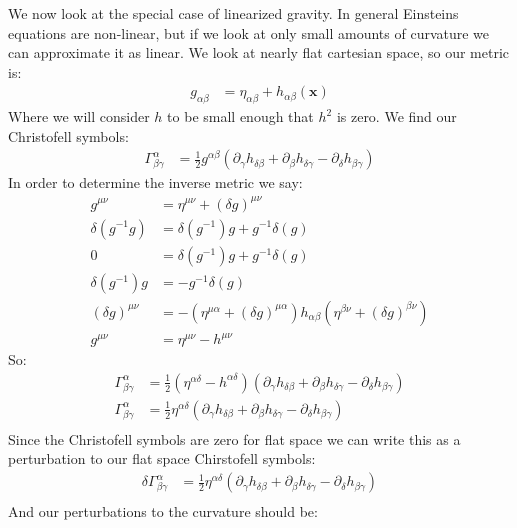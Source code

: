 We now look at the special case of linearized gravity. In general Einsteins equations are non-linear, but if we look at only small amounts of curvature we can approximate it as linear.
We look at nearly flat cartesian space, so our metric is:
\begin{align*}
	g_{\alpha\beta} &= \eta_{\alpha\beta} + h_{\alpha\beta}(\bm{x})
\end{align*}
Where we will consider $h$ to be small enough that $h^2$ is zero.
We find our Christofell symbols:
\begin{align*}
	\Gamma^\alpha_{\beta\gamma} &= \frac{1}{2} g^{\alpha\beta}(\partial_\gamma h_{\delta\beta} + \partial_\beta h_{\delta\gamma} - \partial_\delta h_{\beta\gamma})
\end{align*}
In order to determine the inverse metric we say:
\begin{align*}
	g^{\mu\nu} &= \eta^{\mu\nu} + (\delta g)^{\mu\nu} \\
	\delta(g^{-1} g) &= \delta(g^{-1}) g + g^{-1} \delta(g) \\
	0 &= \delta(g^{-1}) g + g^{-1} \delta(g) \\
	\delta(g^{-1}) g &=  - g^{-1} \delta(g) \\
	(\delta g)^{\mu\nu} &= -(\eta^{\mu\alpha} + (\delta g)^{\mu\alpha})h_{\alpha\beta} (\eta^{\beta\nu} + (\delta g)^{\beta\nu}) \\
	g^{\mu\nu} &= \eta^{\mu\nu} - h^{\mu\nu}
\end{align*}
So:
\begin{align*}
	\Gamma^\alpha_{\beta\gamma} &= \frac{1}{2} (\eta^{\alpha\delta} - h^{\alpha\delta})(\partial_\gamma h_{\delta\beta} + \partial_\beta h_{\delta\gamma} - \partial_\delta h_{\beta\gamma}) \\
	\Gamma^\alpha_{\beta\gamma} &= \frac{1}{2} \eta^{\alpha\delta}(\partial_\gamma h_{\delta\beta} + \partial_\beta h_{\delta\gamma} - \partial_\delta h_{\beta\gamma}) \\
\end{align*}
Since the Christofell symbols are zero for flat space we can write this as a perturbation to our flat space Chirstofell symbols:
\begin{align*}
	\delta\Gamma^\alpha_{\beta\gamma} &= \frac{1}{2} \eta^{\alpha\delta}(\partial_\gamma h_{\delta\beta} + \partial_\beta h_{\delta\gamma} - \partial_\delta h_{\beta\gamma}) \\
\end{align*}
And our perturbations to the curvature should be:
